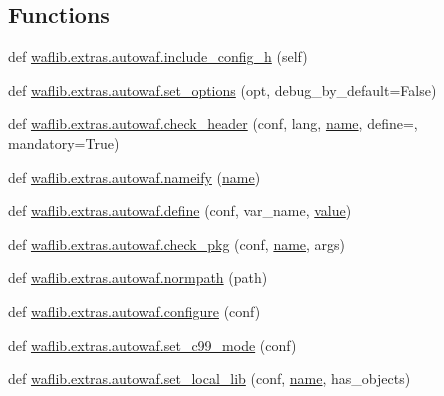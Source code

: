 \subsection*{Functions}
\begin{DoxyCompactItemize}
\item 
def \hyperlink{namespacewaflib_1_1extras_1_1autowaf_accf5c76eadfa640cc8663773bfa12ed0}{waflib.\+extras.\+autowaf.\+include\+\_\+config\+\_\+h} (self)
\item 
def \hyperlink{namespacewaflib_1_1extras_1_1autowaf_a6017597a772d204bcd79d2f6b81e9458}{waflib.\+extras.\+autowaf.\+set\+\_\+options} (opt, debug\+\_\+by\+\_\+default=False)
\item 
def \hyperlink{namespacewaflib_1_1extras_1_1autowaf_aff6706772a1275799816edddf80257a6}{waflib.\+extras.\+autowaf.\+check\+\_\+header} (conf, lang, \hyperlink{lib_2expat_8h_a1b49b495b59f9e73205b69ad1a2965b0}{name}, define=\textquotesingle{}\textquotesingle{}, mandatory=True)
\item 
def \hyperlink{namespacewaflib_1_1extras_1_1autowaf_af87422be997d380570a60e1d8651a3c7}{waflib.\+extras.\+autowaf.\+nameify} (\hyperlink{lib_2expat_8h_a1b49b495b59f9e73205b69ad1a2965b0}{name})
\item 
def \hyperlink{namespacewaflib_1_1extras_1_1autowaf_ad4238d888f4c394c2e928dd8a9f3895e}{waflib.\+extras.\+autowaf.\+define} (conf, var\+\_\+name, \hyperlink{lib_2expat_8h_a4a30a13b813682e68c5b689b45c65971}{value})
\item 
def \hyperlink{namespacewaflib_1_1extras_1_1autowaf_ab416df5fd79258864b88fcc05c46eff2}{waflib.\+extras.\+autowaf.\+check\+\_\+pkg} (conf, \hyperlink{lib_2expat_8h_a1b49b495b59f9e73205b69ad1a2965b0}{name}, args)
\item 
def \hyperlink{namespacewaflib_1_1extras_1_1autowaf_a171473c8ebbf382bf01dd0a219bd62ce}{waflib.\+extras.\+autowaf.\+normpath} (path)
\item 
def \hyperlink{namespacewaflib_1_1extras_1_1autowaf_aed9c0237757b6bbcc7a442d726e82c47}{waflib.\+extras.\+autowaf.\+configure} (conf)
\item 
def \hyperlink{namespacewaflib_1_1extras_1_1autowaf_ae7b5a43bf0512c14173807eca0b78ff8}{waflib.\+extras.\+autowaf.\+set\+\_\+c99\+\_\+mode} (conf)
\item 
def \hyperlink{namespacewaflib_1_1extras_1_1autowaf_ae92a96787fdf9a6b51392f8227019aa0}{waflib.\+extras.\+autowaf.\+set\+\_\+local\+\_\+lib} (conf, \hyperlink{lib_2expat_8h_a1b49b495b59f9e73205b69ad1a2965b0}{name}, has\+\_\+objects)
\item 

\end{DoxyCompactItemize}
